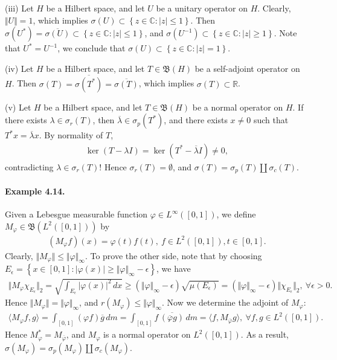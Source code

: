 \documentclass{article}
\begin{document}
(iii) Let $H$ be a Hilbert space, and let $U$ be a unitary operator on $H$. Clearly, $\Vert U\Vert = 1$, which implies $\sigma(U)\subset\left\{z\in\mathbb{C}:\vert z\vert\leq 1\right\}$. Then $\sigma(U^*)=\overline{\sigma(U)}\subset\left\{z\in\mathbb{C}:\vert z\vert\leq 1\right\}$, and $\sigma(U^{-1})\subset\left\{z\in\mathbb{C}:\vert z\vert\geq 1\right\}$. Note that $U^*=U^{-1}$, we conclude that $\sigma(U)\subset\left\{z\in\mathbb{C}:\vert z\vert= 1\right\}$.
\vspace{0.1cm}

(iv) Let $H$ be a Hilbert space, and let $T\in\mathfrak{B}(H)$ be a self-adjoint operator on $H$. Then $\sigma(T)=\overline{\sigma(T^*)} = \overline{\sigma(T)}$, which implies $\sigma(T)\subset\mathbb{R}$.\vspace{0.1cm}

(v) Let $H$ be a Hilbert space, and let $T\in\mathfrak{B}(H)$ be a normal operator on $H$. If there exists $\lambda\in\sigma_r(T)$, then $\overline{\lambda}\in\sigma_p(T^*)$, and there exists $x\neq 0$ such that $T^*x=\overline{\lambda}x$. By normality of $T$, 
\begin{align*}
	\ker(T-\lambda I) = \ker(T^* - \overline{\lambda} I) \neq 0,
\end{align*}
contradicting $\lambda\in\sigma_r(T)$! Hence $\sigma_r(T)=\emptyset$, and $\sigma(T)=\sigma_p(T)\amalg\sigma_c(T)$.

\paragraph{Example 4.14.\label{example:4.14}} Given a Lebesgue measurable function $\varphi\in L^\infty([0,1])$, we define $M_\varphi\in\mathfrak{B}(L^2([0,1]))$ by
\begin{align*}
	(M_\varphi f)(x) = \varphi(t) f(t),\ f\in L^2([0,1]), t\in[0,1].
\end{align*}
Clearly, $\Vert M_\varphi\Vert \leq\Vert \varphi\Vert_\infty$. To prove the other side, note that by choosing $E_\epsilon=\left\{x\in[0,1]:\vert \varphi(x)\vert\geq\Vert \varphi\Vert_\infty - \epsilon\right\}$, we have
\begin{align*}
	\Vert M_\varphi\chi_{E_\epsilon}\Vert_2 = \sqrt{\int_{E_\epsilon} \vert\varphi(x)\vert^2\,dx}\geq \left(\Vert\varphi\Vert_\infty - \epsilon\right)\sqrt{\mu(E_\epsilon)} = \left(\Vert\varphi\Vert_\infty - \epsilon\right)\Vert\chi_{E_\epsilon}\Vert_2,\ \forall\epsilon>0.
\end{align*}
Hence $\Vert M_\varphi\Vert=\Vert\varphi\Vert_\infty$, and $r(M_\varphi)\leq\Vert\varphi\Vert_\infty$. Now we determine the adjoint of $M_\varphi$:
\begin{align*}
	\langle M_\varphi f,g\rangle = \int_{[0,1]}\left(\varphi f\right)\overline{g}\,dm = \int_{[0,1]}f\,\overline{\left(\overline{\varphi}g\right)}\,dm = \langle f,M_{\overline{\varphi}}g\rangle,\ \forall f,g\in L^2([0,1]).
\end{align*}
Hence $M_\varphi^* = M_{\overline{\varphi}}$, and $M_\varphi$ is a normal operator on $L^2([0,1])$. As a result, $\sigma(M_\varphi)=\sigma_p(M_\varphi)\amalg\sigma_c(M_\varphi)$.
\vspace{0.1cm}
\end{document}
